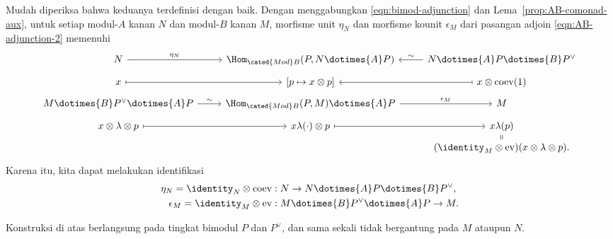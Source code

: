 Mudah diperiksa bahwa keduanya terdefinisi dengan baik. Dengan menggabungkan
\eqref{eqn:bimod-adjunction} dan Lema~\ref{prop:AB-comonad-aux}, untuk setiap
modul-$A$ kanan $N$ dan modul-$B$ kanan $M$, morfisme unit $\eta_N$ dan
morfisme kounit $\epsilon_M$ dari pasangan adjoin
\eqref{eqn:AB-adjunction-2} memenuhi
\[\begin{tikzcd}[row sep=tiny]
	N \arrow[r, "\eta_N"] & \Hom_{\cated{Mod}B}(P, N \dotimes{A} P) & N \dotimes{A} P \dotimes{B} P^\vee \arrow[l, "\sim"'] \\
	x \arrow[mapsto, r] & {[p \mapsto x \otimes p]} & x \otimes \mathrm{coev}(1) \arrow[mapsto, l] \\
	M \dotimes{B} P^\vee \dotimes{A} P \arrow[r, "\sim"] & \Hom_{\cated{Mod}B}(P, M) \dotimes{A} P \arrow[r, "\epsilon_M"] & M \\
	x \otimes \lambda \otimes p \arrow[mapsto, r] & x \lambda(\cdot) \otimes p \arrow[mapsto, r] & x\lambda(p) \arrow[equal, d] \\
	& & (\identity_M \otimes \mathrm{ev})(x \otimes \lambda \otimes p).
\end{tikzcd}\]
Karena itu, kita dapat melakukan identifikasi
\begin{align*}
	\eta_N = \identity_N \otimes \mathrm{coev}: \; & N \to N \dotimes{A} P \dotimes{B} P^\vee , \\
	\epsilon_M = \identity_M \otimes \mathrm{ev}: \; & M \dotimes{B} P^\vee \dotimes{A} P \to M.
\end{align*}

Konstruksi di atas berlangsung pada tingkat bimodul $P$ dan $P^\vee$, dan
sama sekali tidak bergantung pada $M$ ataupun $N$.

